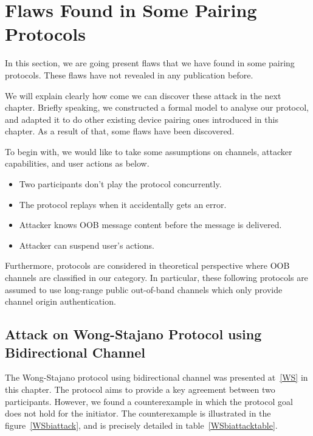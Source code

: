 \section{Flaws Found in Some Pairing Protocols}

In this section, we are going present flaws that we have found in some pairing protocols. These flaws have not revealed in any publication before. 

We will explain clearly how come we can discover these attack in the next chapter. Briefly speaking, we constructed a formal model to analyse our protocol, and adapted it to do other existing device pairing ones introduced in this chapter. As a result of that, some flaws have been discovered. 

To begin with, we would like to take some assumptions on channels, attacker capabilities, and user actions as below. 
\begin{itemize}
\item Two participants don't play the protocol concurrently.
\item The protocol replays when it accidentally gets an error. 
\item Attacker knows OOB message content before the message is delivered.
\item Attacker can suspend user's actions. 
\end{itemize}

Furthermore, protocols are considered in theoretical perspective where OOB channels are classified in our category. In particular, these following protocols are assumed to use long-range public out-of-band channels which only provide channel origin authentication.  

\subsection{Attack on Wong-Stajano Protocol using Bidirectional Channel}

The Wong-Stajano protocol using bidirectional channel was presented at~\ref{WS} in this chapter. The protocol aims to provide a key agreement between two participants. However, we found a counterexample in which the protocol goal does not hold for the initiator. The counterexample is illustrated in the figure~\ref{WSbiattack}, and is precisely detailed in table~\ref{WSbiattacktable}. 

